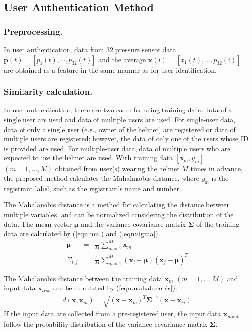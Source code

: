 \documentclass[english,preprint,JIP]{ipsj}
\begin{document}
\subsection{User Authentication Method}


\subsubsection{Preprocessing.}
In user authentication, data from 32 pressure sensor data $\bm{p}(t)=[p_1(t),\cdots,p_{32}(t)]$ and the average $\bm{x}(t)=[x_{1}(t),\dots,p_{32}(t)]$ are obtained as a feature in the same manner as for user identification.


\subsubsection{Similarity calculation.}
In user authentication, there are two cases for using training data: data of a single user are used and data of multiple users are used. For single-user data, data of only a single user (e.g., owner of the helmet) are registered or data of multiple users are registered; however, the data of only one of the users whose ID is provided are used. For multiple-user data, data of multiple users who are expected to use the helmet are used. With training data $[\bm{x}_m,y_m]$ $(m=1,\dots, M)$ obtained from user(s) wearing the helmet $M$ times in advance, the proposed method calculates the Mahalanobis distance, where $y_m$ is the registrant label, such as the registrant's name and number.\par

The Mahalanobis distance is a method for calculating the distance between multiple variables, and can be normalized considering the distribution of the data. The mean vector $\bm{\mu}$ and the variance-covariance matrix $\bm{\Sigma}$ of the training data are calculated by (\ref{eqn:mu}) and (\ref{eqn:sigma}).
\begin{eqnarray}
\label{eqn:mu}
  \bm{\mu} &=& \frac{1}{M}\sum_{m=1}^{M}\bm{x}_m \\
\label{eqn:sigma}
  \Sigma_{i,j} &=& \frac{1}{M}\sum_{m=1}^{M}(\bm{x}_i-\bm{\mu})(\bm{x}_j-\bm{\mu})^T
\end{eqnarray}
 
The Mahalanobis distance between the training data $\bm{x}_m$ $(m=1,\dots, M)$ and input data $\bm{x}_{test}$ can be calculated by (\ref{eqn:mahalanobis}).
\begin{eqnarray}
\label{eqn:mahalanobis}
  d(\bm{x},\bm{x}_m) = \sqrt{(\bm{x}-\bm{x}_m)^{T}\bm{\Sigma}^{-1}(\bm{x}-\bm{x}_m)}
\end{eqnarray}
If the input data are collected from a pre-registered user, the input data $\bm{x}_{input}$ follow the probability distribution of the variance-covariance matrix $\bm{\Sigma}$.
\end{document}
